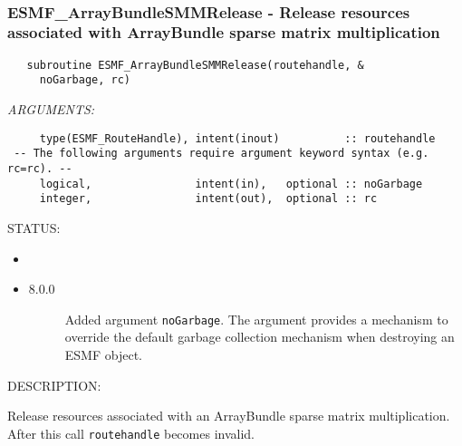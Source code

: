  
\mbox{}\hrulefill\ 
 
\subsubsection [ESMF\_ArrayBundleSMMRelease] {ESMF\_ArrayBundleSMMRelease - Release resources associated with ArrayBundle sparse matrix multiplication}


  
\begin{verbatim}   subroutine ESMF_ArrayBundleSMMRelease(routehandle, &
     noGarbage, rc)\end{verbatim}{\em ARGUMENTS:}
\begin{verbatim}     type(ESMF_RouteHandle), intent(inout)          :: routehandle
 -- The following arguments require argument keyword syntax (e.g. rc=rc). --
     logical,                intent(in),   optional :: noGarbage
     integer,                intent(out),  optional :: rc\end{verbatim}
{\sf STATUS:}
   \begin{itemize}
   \item{}
   \item{}
   \begin{description}
   \item[8.0.0] Added argument {\tt noGarbage}.
     The argument provides a mechanism to override the default garbage collection
     mechanism when destroying an ESMF object.
   \end{description}
   \end{itemize}
  
{\sf DESCRIPTION:\\ }


     Release resources associated with an ArrayBundle sparse matrix multiplication. 
     After this call {\tt routehandle} becomes invalid.
  
